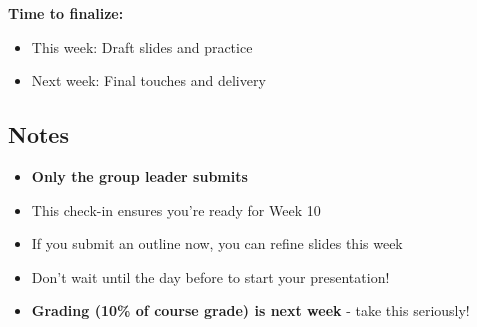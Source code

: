 \documentclass[10pt]{article}
\begin{document}
\textbf{Time to finalize:}
\begin{itemize}[leftmargin=20pt]
\item This week: Draft slides and practice
\item Next week: Final touches and delivery
\end{itemize}

\subsection*{Notes}

\begin{itemize}[leftmargin=20pt]
\item \textbf{Only the group leader submits}
\item This check-in ensures you're ready for Week 10
\item If you submit an outline now, you can refine slides this week
\item Don't wait until the day before to start your presentation!
\item \textbf{Grading (10\% of course grade) is next week} - take this seriously!
\end{itemize}
\end{document}
